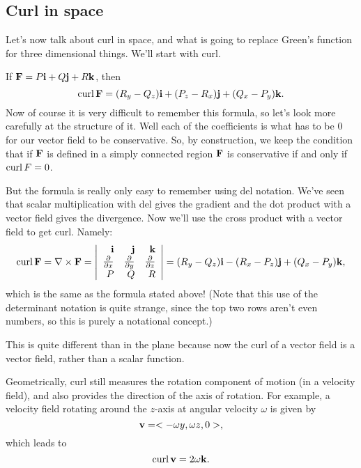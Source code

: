 \subsection{Curl in space}

Let's now talk about curl in space, and what is going to replace Green's function for three dimensional things. We'll start with curl. 

\bdf
If $\boldsymbol{\mathbf{F}} = P\boldsymbol{\mathbf{i}}+Q\boldsymbol{\mathbf{j}}+R\boldsymbol{\mathbf{k}}$, then
\[ \mathrm{curl}\, \boldsymbol{\mathbf{F}} = (R_y-Q_z)\boldsymbol{\mathbf{i}} + (P_z-R_x)\boldsymbol{\mathbf{j}} +(Q_x-P_y)\boldsymbol{\mathbf{k}}. \]
Now of course it is very difficult to remember this formula, so let's look more carefully at the structure of it. Well each of the coefficients is what has to be 0 for our vector field to be conservative. So, by construction, we keep the condition that if $\boldsymbol{\mathbf{F}}$ is defined in a simply connected region $\boldsymbol{\mathbf{F}}$ is conservative if and only if $\mathrm{curl}\, F = 0$.

But the formula is really only easy to remember using del notation. We've seen that scalar multiplication with del gives the gradient and the dot product with a vector field gives the divergence. Now we'll use the cross product with a vector field to get curl. Namely:
\[ \mathrm{curl}\, \boldsymbol{\mathbf{F}} = \nabla \times \boldsymbol{\mathbf{F}} = \left| \begin{array}{rrrrrrrrrrrrrrrrrrrrrrrrr} \boldsymbol{\mathbf{i}} & \boldsymbol{\mathbf{j}} & \boldsymbol{\mathbf{k}} \\ \frac{\partial }{\partial x} & \frac{\partial }{\partial y} & \frac{\partial }{\partial z} \\ P & Q & R\\ \end{array} \right| = (R_y-Q_z)\boldsymbol{\mathbf{i}} - (R_x-P_z)\boldsymbol{\mathbf{j}} +(Q_x-P_y)\boldsymbol{\mathbf{k}}, \]
which is the same as the formula stated above! (Note that this use of the determinant notation is quite strange, since the top two rows aren't even numbers, so this is purely a notational concept.)
\edf

\brm
This is quite different than in the plane because now the curl of a vector field is a vector field, rather than a scalar function.
\erm

Geometrically, curl still measures the rotation component of motion (in a velocity field), and also provides the direction of the axis of rotation. For example, a velocity field rotating around the $z$-axis at angular velocity $\omega$ is given by 
\[ \boldsymbol{\mathbf{v}} = <-\omega y, \omega z,0>, \]
which leads to
\[ \mathrm{curl}\, \boldsymbol{\mathbf{v}} = 2\omega \boldsymbol{\mathbf{k}}. \] 



